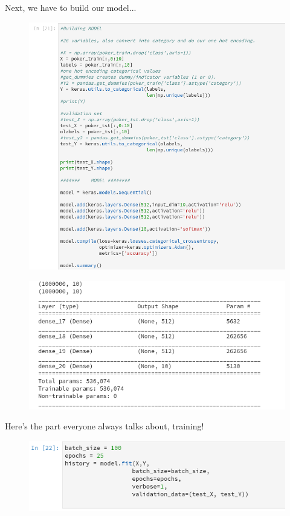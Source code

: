\documentclass[11pt]{article}
\makeatletter
\def\maxwidth{\ifdim\Gin@nat@width>\linewidth\linewidth
    \else\Gin@nat@width\fi}
\let\Oldincludegraphics\includegraphics
\renewcommand{\includegraphics}[1]{\Oldincludegraphics[width=.8\maxwidth]{#1}}
\makeatother
\begin{document}
    Next, we have to build our model...

    \begin{figure}[htbp]
\centering
\includegraphics{build_FFNN_model.png}
\caption{}
\end{figure}

    \begin{figure}[htbp]
\centering
\includegraphics{build_FFNN_model_2.png}
\caption{}
\end{figure}

    Here's the part everyone always talks about, training!

    \begin{figure}[htbp]
\centering
\includegraphics{train_FFNN.png}
\caption{}
\end{figure}
\end{document}

